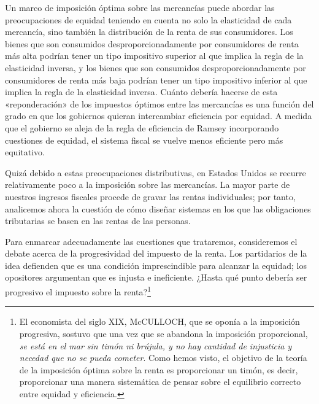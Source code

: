 \documentclass[10pt,a4paper]{article}
\begin{document}
Un marco de imposición óptima sobre las mercancías puede abordar las preocupaciones de equidad teniendo en cuenta no solo la elasticidad de cada mercancía, sino también la distribución de la renta de sus consumidores. Los bienes que son consumidos desproporcionadamente por consumidores de renta más alta podrían tener un tipo impositivo superior al que implica la regla de la elasticidad inversa, y los bienes que son consumidos desproporcionadamente por consumidores de renta más baja podrían tener un tipo impositivo inferior al que implica la regla de la elasticidad inversa. Cuánto debería hacerse de esta «reponderación» de los impuestos óptimos entre las mercancías es una función del grado en que los gobiernos quieran intercambiar eficiencia por equidad. A medida que el gobierno se aleja de la regla de eficiencia de Ramsey incorporando cuestiones de equidad, el sistema fiscal se vuelve menos eficiente pero más equitativo.

Quizá debido a estas preocupaciones distributivas, en Estados Unidos se recurre relativamente poco a la imposición sobre las mercancías. La mayor parte de nuestros ingresos fiscales procede de gravar las rentas individuales; por tanto, analicemos ahora la cuestión de cómo diseñar sistemas en los que las obligaciones tributarias se basen en las rentas de las personas. 

Para enmarcar adecuadamente las cuestiones que trataremos, consideremos el debate acerca de la progresividad del impuesto de la renta. Los partidarios de la idea defienden que es una condición imprescindible para alcanzar la equidad; los opositores argumentan que es injusta e ineficiente. ¿Hasta qué punto debería ser progresivo el impuesto sobre la renta?\footnote{%
    El economista del siglo XIX, McCULLOCH, que se oponía a la imposición progresiva, sostuvo que una vez que se abandona la imposición proporcional, \textit{se está en el mar sin timón ni brújula, y no hay cantidad de injusticia y necedad que no se pueda cometer}. Como hemos visto, el objetivo de la teoría de la imposición óptima sobre la renta es proporcionar un timón, es decir, proporcionar una manera sistemática de pensar sobre el equilibrio correcto entre equidad y eficiencia.
}
\end{document}
